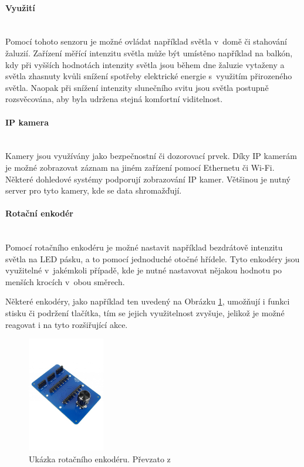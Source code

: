 \paragraph*{Využití}\mbox{} \\
Pomocí tohoto senzoru je možné ovládat například světla v~domě či stahování žaluzií. 
Zařízení měřící intenzitu světla může být umístěno například na balkón, kdy při vyšších hodnotách intenzity světla jsou během dne žaluzie vytaženy a světla zhasnuty kvůli snížení spotřeby elektrické energie s~využitím přirozeného světla. Naopak při snížení intenzity slunečního svitu jsou světla postupně rozsvěcována, aby byla udržena stejná komfortní viditelnost.

\paragraph*{IP kamera}\mbox{} \\
Kamery jsou využívány jako bezpečnostní či dozorovací prvek. Díky IP kamerám je možné zobrazovat záznam na jiném zařízení pomocí Ethernetu či Wi-Fi. Některé dohledové systémy podporují zobrazování IP kamer. Většinou je nutný server pro tyto kamery, kde se data shromažďují.

\paragraph*{Rotační enkodér}\mbox{} \\
Pomocí rotačního enkodéru je možné nastavit například bezdrátově intenzitu světla na LED pásku, a to pomocí jednoduché otočné hřídele. Tyto enkodéry jsou využitelné v~jakémkoli případě, kde je nutné nastavovat nějakou hodnotu po menších krocích v~obou směrech. 

Některé enkodéry, jako například ten uvedený na Obrázku \ref{encoderModule}, umožňují i funkci stisku či podržení tlačítka, tím se jejich využitelnost zvyšuje, jelikož je možné reagovat i na tyto rozšiřující akce.

\begin{figure}[H]
  \centering
  \includegraphics[width=0.3\textwidth]{obrazky-figures/hardwareComponents/encoderModule.jpg}
  \caption{Ukázka rotačního enkodéru. Převzato z~\cite{hardwario-module-overview}}
  \label{encoderModule}
\end{figure}

